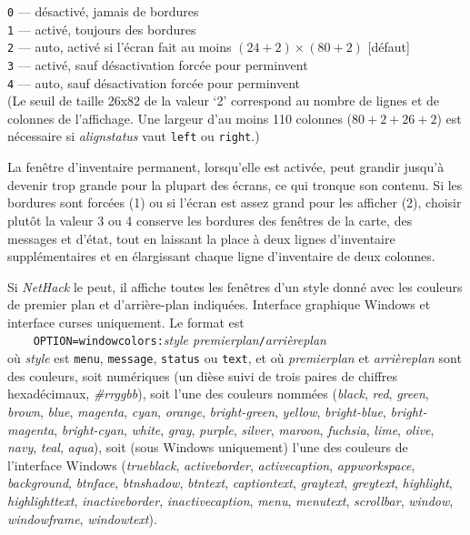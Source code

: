 \documentclass[titlepage]{article}
\begin{document}
\begin{description}[font=\mdseries\itshape]
\texttt{0} --- désactivé, jamais de bordures\\
\texttt{1} --- activé, toujours des bordures\\
\texttt{2} --- auto, activé si l'écran fait au moins
$(24+2)\times(80+2)$ [défaut]\\
\texttt{3} --- activé, sauf désactivation forcée pour perm\textunderscore invent\\
\texttt{4} --- auto, sauf désactivation forcée pour perm\textunderscore invent\\

(Le seuil de taille 26x82 de la valeur `2' correspond au nombre de lignes et
de colonnes de l'affichage.
Une largeur d'au moins 110 colonnes ($80+2+26+2$) est nécessaire si
\textit{align\textunderscore status}
vaut \texttt{left} ou \texttt{right}.)

La fenêtre d'inventaire permanent, lorsqu'elle est activée, peut grandir jusqu'à
devenir trop grande pour la plupart des écrans, ce qui tronque son contenu.
Si les bordures sont forcées (1) ou si l'écran est assez grand pour les afficher (2),
choisir plutôt la valeur 3 ou 4 conserve les bordures des fenêtres de la carte,
des messages et d'état, tout en laissant la place à deux lignes d'inventaire
supplémentaires et en élargissant chaque ligne d'inventaire de deux colonnes.
\item[windowcolors]
Si \textit{NetHack} le peut, il affiche toutes les fenêtres d'un style donné
avec les couleurs de premier plan et d'arrière-plan indiquées.
Interface graphique Windows et interface curses uniquement.
Le format est\\
\texttt{~~~~OPTION=windowcolors:}\textit{style premier\textunderscore plan}\texttt{/}\textit{arrière\textunderscore plan}\\
où \textit{style} est \texttt{menu}, \texttt{message}, \texttt{status}
ou \texttt{text}, et où
\textit{premier\textunderscore plan} et \textit{arrière\textunderscore plan} sont des couleurs, soit numériques
(un dièse suivi de trois paires de chiffres hexadécimaux, \textit{\#rrggbb}),
soit l'une des couleurs nommées (\textit{black}, \textit{red}, \textit{green}, \textit{brown},
\textit{blue}, \textit{magenta}, \textit{cyan}, \textit{orange},
\textit{bright-green}, \textit{yellow}, \textit{bright-blue}, \textit{bright-magenta},
\textit{bright-cyan}, \textit{white}, \textit{gray}, \textit{purple},
\textit{silver}, \textit{maroon}, \textit{fuchsia}, \textit{lime}, \textit{olive},
\textit{navy}, \textit{teal}, \textit{aqua}),
soit (sous Windows uniquement) l'une des couleurs de l'interface Windows (\textit{trueblack},
\textit{activeborder}, \textit{activecaption}, \textit{appworkspace}, \textit{background},
\textit{btnface}, \textit{btnshadow}, \textit{btntext}, \textit{captiontext},
\textit{graytext}, \textit{greytext}, \textit{highlight},
\textit{highlighttext}, \textit{inactiveborder}, \textit{inactivecaption}, \textit{menu},
\textit{menutext}, \textit{scrollbar}, \textit{window}, \textit{windowframe},
\textit{windowtext}).


\end{description}
\end{document}
